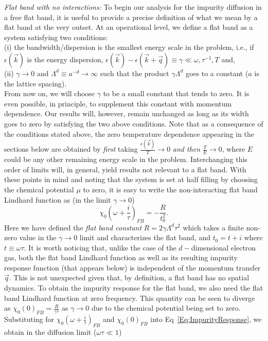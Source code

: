 \documentclass[prl,aps,twocolumn,groupaddress]{revtex4-1}
\begin{document}
\textit{Flat band with no interactions:} To begin our analysis for the impurity diffusion in a free flat band, it is useful to  provide a precise definition of what we mean by a flat band at the very outset. At an operational level, we define a flat band as a system satisfying two conditions:\\ \newline (i) the bandwidth/dispersion is the smallest energy scale in the problem, i.e., if $\epsilon(\vec k)$ is the energy dispersion, $\epsilon(\vec k) - \epsilon(\vec k + \vec q) \equiv \gamma \ll \omega, \tau^{-1}, T$ and, \\ \newline (ii) $\gamma\rightarrow 0$ and $\Lambda^d \equiv a^{-d} \rightarrow \infty$ such that the product $\gamma \Lambda^d $ goes to a constant ($a$ is the lattice spacing).\\ \newline From now on, we will choose $\gamma$ to be a small constant that tends to zero. It is even possible, in principle, to supplement this constant with momentum dependence.  Our results will, however, remain unchanged as long as its width goes to zero by satisfying the two above conditions. Note that as a consequence of the conditions stated above, the zero temperature dependence appearing in the sections below are obtained by \textit{first} taking $\frac{\epsilon(\vec k)}{T}\rightarrow0$ \textit{and then} $\frac{T}{E}\rightarrow 0$, where $E$ could be any other remaining energy scale in the problem. Interchanging this order of limits will, in general, yield results not relevant to a flat band. With these points in mind and noting that the system is set at half filling by choosing the chemical potential $\mu$ to zero, it is easy to write the non-interacting flat band Lindhard function as  (in the limit $\gamma\rightarrow0$)
\begin{equation}
\chi_0\left(\omega+ \frac{i}{\tau}\right)_{FB} = -\frac{R}{t_0^2}.
\label{eq:FreeFlatBand}
\end{equation}
Here we have defined the \textit{flat band constant} $R = 2 \gamma \Lambda^d \tau^2$ which takes a finite non-zero value in the $\gamma \rightarrow 0$ limit and characterizes the flat band, and $t_0 = t + i$ where $t\equiv \omega \tau$. It is worth noticing that,  unlike the case of the $d-$dimensional electron gas, both the flat band Lindhard function as well as its resulting impurity response function (that appears below) is independent of the momentum transfer $\vec q$. This is not unexpected given that, by definition, a flat band has no spatial dynamics. To obtain the impurity response for the flat band, we also need the flat band Lindhard function at zero frequency. This quantity can be seen to diverge as $\chi_0(0)_{FB} = \frac{R}{\gamma^2}$ as $\gamma\rightarrow 0$ due to the chemical potential being set to zero. Substituting for $\chi_0\left(\omega+ \frac{i}{\tau}\right)_{FB}$ and $\chi_0(0)_{FB}$ into Eq~\ref{Eq:ImpurityResponse}, we obtain in the diffusion limit ($\omega\tau\ll 1$)
\end{document}
